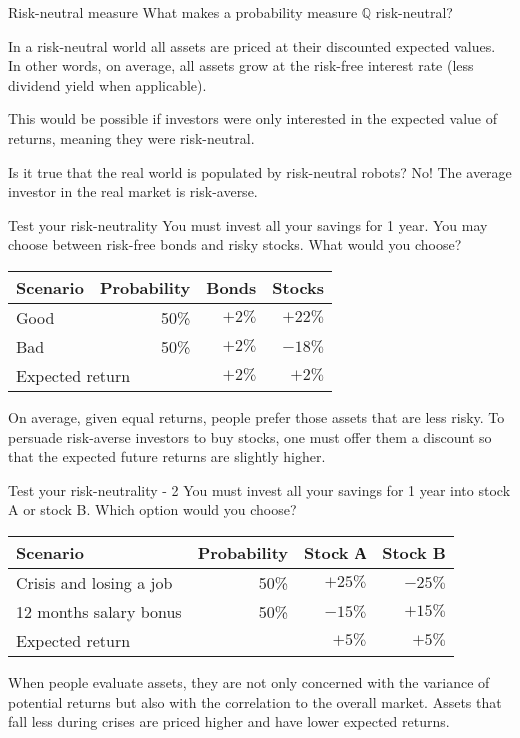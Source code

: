 \documentclass{beamer}
\begin{document}
\begin{frame}{Risk-neutral measure}
\justify
What makes a probability measure $\mathbb{Q}$ risk-neutral?

\justify
In a risk-neutral world all assets are priced at their discounted expected values. In other words, on average, all assets grow at the risk-free interest rate (less dividend yield when applicable).

\justify
This would be possible if investors were only interested in the expected value of returns, meaning they were \alert{risk-neutral}.

\justify
Is it true that the real world is populated by risk-neutral robots? No! The average investor in the real market is \alert{risk-averse}.
\end{frame}



\begin{frame}{Test your risk-neutrality}
\justify
You must invest all your savings for 1 year. You may choose between risk-free bonds and risky stocks. What would you choose?

\justify
\centering
\begin{tabular}{l|r|r|r}
Scenario & Probability & Bonds & Stocks \\ \hline
Good & 50\%   & $+2\%$    & $+22\%$  \\
Bad   & 50\%   & $+2\%$    & $-18\%$  \\ \hline
\multicolumn{2}{l|}{Expected return} & $+2\%$ & $+2\%$
\end{tabular}

\pause
\justify
On average, given equal returns, people prefer those assets that are less risky. To persuade risk-averse investors to buy stocks, one must offer them a discount so that the expected future returns are slightly higher.
\end{frame}



\begin{frame}{Test your risk-neutrality - 2}
\justify
You must invest all your savings for 1 year into stock A or stock B. Which option would you choose?

\justify
\centering
\begin{tabular}{l|r|r|r}
Scenario & Probability & Stock А & Stock B \\ \hline
Crisis and losing a job  & 50\%    & $+25\%$ & $-25\%$  \\
12 months salary bonus    & 50\%    & $-15\%$ & $+15\%$  \\ \hline
\multicolumn{2}{l|}{Expected return} & $+5\%$  & $+5\%$
\end{tabular}

\pause
\justify
When people evaluate assets, they are not only concerned with the variance of potential returns but also with the correlation to the overall market. Assets that fall less during crises are priced higher and have lower expected returns.
\end{frame}
\end{document}
